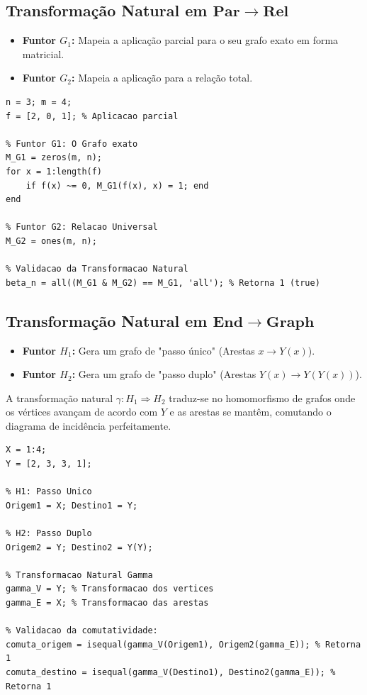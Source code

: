 \documentclass[11pt,a4paper]{article}
\begin{document}
\subsection{Transformação Natural em $\mathbf{Par} \to \mathbf{Rel}$}
\begin{itemize}
    \item \textbf{Funtor $G_1$:} Mapeia a aplicação parcial para o seu grafo exato em forma matricial.
    \item \textbf{Funtor $G_2$:} Mapeia a aplicação para a relação total.
\end{itemize}

\begin{lstlisting}[caption={Transformacao em Par -> Rel}]
n = 3; m = 4;
f = [2, 0, 1]; % Aplicacao parcial

% Funtor G1: O Grafo exato
M_G1 = zeros(m, n);
for x = 1:length(f)
    if f(x) ~= 0, M_G1(f(x), x) = 1; end
end

% Funtor G2: Relacao Universal
M_G2 = ones(m, n);

% Validacao da Transformacao Natural
beta_n = all((M_G1 & M_G2) == M_G1, 'all'); % Retorna 1 (true)
\end{lstlisting}

\subsection{Transformação Natural em $\mathbf{End} \to \mathbf{Graph}$}
\begin{itemize}
    \item \textbf{Funtor $H_1$:} Gera um grafo de "passo único" (Arestas $x \to Y(x)$).
    \item \textbf{Funtor $H_2$:} Gera um grafo de "passo duplo" (Arestas $Y(x) \to Y(Y(x))$).
\end{itemize}
A transformação natural $\gamma: H_1 \Rightarrow H_2$ traduz-se no homomorfismo de grafos onde os vértices avançam de acordo com $Y$ e as arestas se mantêm, comutando o diagrama de incidência perfeitamente.

\begin{lstlisting}[caption={Transformacao em End -> Graph}]
X = 1:4;
Y = [2, 3, 3, 1]; 

% H1: Passo Unico
Origem1 = X; Destino1 = Y;

% H2: Passo Duplo
Origem2 = Y; Destino2 = Y(Y);

% Transformacao Natural Gamma
gamma_V = Y; % Transformacao dos vertices
gamma_E = X; % Transformacao das arestas

% Validacao da comutatividade:
comuta_origem = isequal(gamma_V(Origem1), Origem2(gamma_E)); % Retorna 1
comuta_destino = isequal(gamma_V(Destino1), Destino2(gamma_E)); % Retorna 1
\end{lstlisting}
\end{document}
